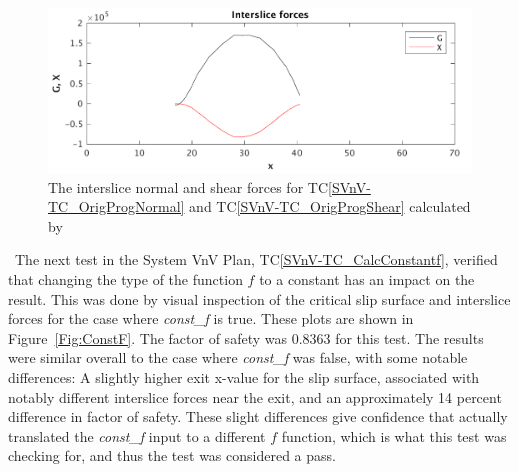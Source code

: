 \documentclass[12pt, titlepage]{article}
\newcommand{\tcref}[1]{TC\ref{#1}}
\begin{document}
\begin{figure}[h!]
	\begin{center}
		\includegraphics[width=1.0\textwidth]{Forces.png}
		\caption{The interslice normal and shear forces for  
		\tcref{SVnV-TC_OrigProgNormal} and  \tcref{SVnV-TC_OrigProgShear}
			calculated by \progname{}}
		\label{Fig:Forces}
	\end{center}
\end{figure}

~\newline \noindent The next test in the System VnV Plan, 
\tcref{SVnV-TC_CalcConstantf}, 
verified that changing the type of the function $f$ to a constant has an impact 
on the result. This was done by visual inspection of the critical slip surface 
and interslice forces for the case where \textit{const\_f} is true. These plots 
are shown in Figure~\ref{Fig:ConstF}. The factor of safety was 0.8363 for this 
test. The results were similar overall to the case where \textit{const\_f} was 
false, with some notable differences: A slightly higher exit x-value for the 
slip surface, associated with notably different interslice forces near the 
exit, and an approximately 14 percent difference in factor of safety. These 
slight differences give confidence that \progname actually translated the 
\textit{const\_f} input to a different $f$ function, which is what this test 
was checking for, and thus the test was considered a pass.
\end{document}
